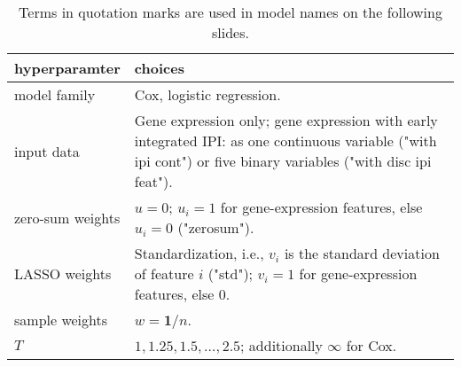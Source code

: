 \begin{table}[ht]
    \centering
    \begin{tabular}{p{}p{}}
        \hline
        hyperparamter & choices \\ 
        \hline
        model family & Cox, logistic regression. \\
        input data & Gene expression only; gene expression with early integrated IPI: 
            as one continuous variable ("with ipi cont") or five binary variables ("with disc ipi feat"). \\ 
        zero-sum weights & $u = 0$; $u_i = 1$ for gene-expression features, 
            else $u_i = 0$ ("zerosum"). \\
        LASSO weights & Standardization, i.e., $v_i$ is the standard deviation of feature $i$ ("std"); 
            $v_i = 1$ for gene-expression features, else $0$. \\
        sample weights & $w = \mathbf{1}/n$. \\
        $T$ & $1, 1.25, 1.5, \ldots, 2.5$; additionally $\infty$ for Cox. \\
       \hline
    \end{tabular}
    \caption{Terms in quotation marks are used in model names on the following slides.}
    \label{fig:hyperpara-schmitz}
    \end{table}
